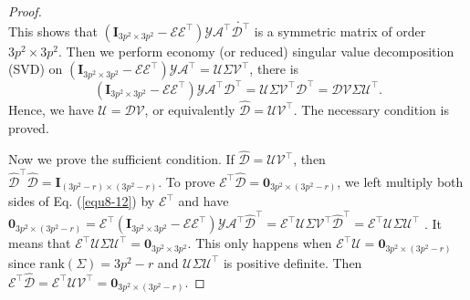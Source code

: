 \begin{proof}
\begin{equation}
.
\end{equation}
This shows that $(\bm{I}_{3p^2\times 3p^2}-\mathcal{E}\mathcal{E}^{\top})\mathcal{Y}\mathcal{A}^{\top}\mathcal{D}^{\top}$ is a symmetric matrix of order $3p^2\times 3p^2$. Then we perform economy (or reduced) singular value decomposition (SVD)  \cite{eckart1936approximation} on $(\bm{I}_{3p^2\times 3p^2}-\mathcal{E}\mathcal{E}^{\top})\mathcal{Y}\mathcal{A}^{\top}=\mathcal{U}\Sigma\mathcal{V}^{\top}$,
there is
\begin{equation}
\label{equ8-12}
(\bm{I}_{3p^2\times 3p^2}-\mathcal{E}\mathcal{E}^{\top})\mathcal{Y}\mathcal{A}^{\top}\mathcal{D}^{\top}
=
\mathcal{U}\Sigma\mathcal{V}^{\top}\mathcal{D}^{\top}
=
\mathcal{D}\mathcal{V}\Sigma\mathcal{U}^{\top}.
\end{equation}
Hence, we have $\mathcal{U}=\mathcal{D}\mathcal{V}$, or equivalently $\hat{\mathcal{D}}=\mathcal{U}\mathcal{V}^{\top}$. The necessary condition is proved. 

Now we prove the sufficient condition. If $\hat{\mathcal{D}}=\mathcal{U}\mathcal{V}^{\top}$, then $\hat{\mathcal{D}}^{\top}\hat{\mathcal{D}}=\bm{I}_{(3p^2-r)\times (3p^2-r)}$. To prove $\mathcal{E}^{\top}\hat{\mathcal{D}}=\bm{0}_{3p^2\times (3p^2-r)}$, we left multiply both sides of Eq. (\ref{equ8-12}) by $\mathcal{E}^{\top}$ and have  
$
\bm{0}_{3p^2\times (3p^2-r)}
=
\mathcal{E}^{\top}(\bm{I}_{3p^2\times 3p^2}-\mathcal{E}\mathcal{E}^{\top})\mathcal{Y}\mathcal{A}^{\top}\hat{\mathcal{D}}^{\top}
=
\mathcal{E}^{\top}\mathcal{U}\Sigma\mathcal{V}^{\top}\hat{\mathcal{D}}^{\top}
=
\mathcal{E}^{\top}\mathcal{U}\Sigma\mathcal{U}^{\top}
$
.
It means that $\mathcal{E}^{\top}\mathcal{U}\Sigma\mathcal{U}^{\top}=\bm{0}_{3p^2\times 3p^2}$. This only happens when $\mathcal{E}^{\top}\mathcal{U}=\bm{0}_{3p^2\times (3p^2-r)}$ since $\text{rank}(\Sigma)=3p^2-r$ and $\mathcal{U}\Sigma\mathcal{U}^{\top}$ is positive definite. Then $\mathcal{E}^{\top}\hat{\mathcal{D}}=\mathcal{E}^{\top}\mathcal{U}\mathcal{V}^{\top}=\bm{0}_{3p^2\times (3p^2-r)}$. 


\end{proof}
